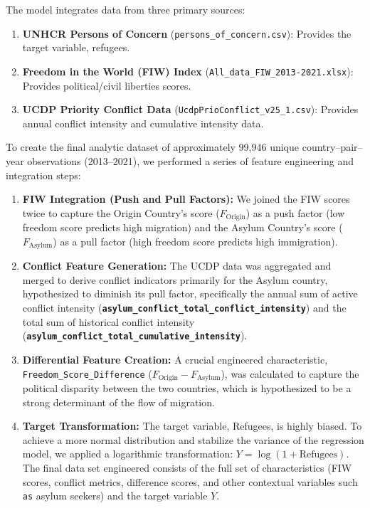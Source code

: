 \documentclass{article}
\theoremstyle{plain}
\theoremstyle{definition}
\theoremstyle{remark}
\begin{document}
The model integrates data from three primary sources:
\begin{samepage}
\begingroup
\setlength{\emergencystretch}{1em}
\sloppy

\begin{enumerate}
    \item \textbf{UNHCR Persons of Concern} (\texttt{persons\_of\_concern.csv}): Provides the target variable, refugees.
    \item \textbf{Freedom in the World (FIW) Index} (\texttt{All\_data\_FIW\_2013-2021.xlsx}): Provides political/civil liberties scores.
    \item \textbf{UCDP Priority Conflict Data} (\texttt{UcdpPrioConflict\_v25\_1.csv}): Provides annual conflict intensity and cumulative intensity data.
\end{enumerate}

\endgroup
\end{samepage}

To create the final analytic dataset of approximately 99,946 unique country–pair–year observations (2013–2021), we performed a series of feature engineering and integration steps:

\begin{enumerate}
    \item \textbf{FIW Integration (Push and Pull Factors):} We joined the FIW scores twice to capture the Origin Country's score ($F_{\text{Origin}}$) as a push factor (low freedom score predicts high migration) and the Asylum Country's score ($F_{\text{Asylum}}$) as a pull factor (high freedom score predicts high immigration).

    \item \textbf{Conflict Feature Generation:} The UCDP data was aggregated and merged to derive conflict indicators primarily for the Asylum country, hypothesized to diminish its pull factor, specifically the annual sum of active conflict intensity (\textbf{\texttt{asylum\_conflict\_total\break\_conflict\_intensity}}) and the total sum of historical conflict intensity (\textbf{\texttt{asylum\_conflict\_total\break\_cumulative\_intensity}}).

    \item \textbf{Differential Feature Creation:} A crucial engineered characteristic, \texttt{Freedom\_Score\_Difference} ($F_{\text{Origin}} - F_{\text{Asylum}}$), was calculated to capture the political disparity between the two countries, which is hypothesized to be a strong determinant of the flow of migration.

    \item \textbf{Target Transformation:} The target variable, Refugees, is highly biased. To achieve a more normal distribution and stabilize the variance of the regression model, we applied a logarithmic transformation: $Y = \log(1 + \text{Refugees})$. The final data set engineered consists of the full set of characteristics (FIW scores, conflict metrics, difference scores, and other contextual variables such \texttt{as} asylum seekers) and the target variable $Y$.
\end{enumerate}
\end{document}
